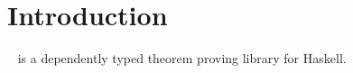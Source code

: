 \section{Introduction}

\Ivor{}~\cite{ivor} is a dependently typed theorem proving library for
Haskell. 